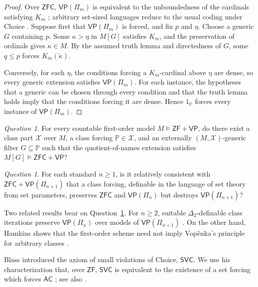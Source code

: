 \documentclass[11pt,a4paper]{amsart}
\newcommand{\VP}{\mathsf{VP}}
\newcommand{\AC}{\mathsf{AC}}
\newcommand{\ZF}{\mathsf{ZF}}
\newcommand{\ZFC}{\mathsf{ZFC}}
\theoremstyle{plain}
\theoremstyle{definition}
\theoremstyle{remark}
\newtheorem{question}[theorem]{Question}
\begin{document}
\begin{proof}
Over $\ZFC$, $\VP(\Pi_m)$ is equivalent to the unboundedness of the cardinals satisfying $K_m$ \cite[Theorem~4.3(2), Corollary~4.7, Theorem~4.11, and the paragraph following Theorem~4.12]{BagariaCn}; arbitrary set-sized languages reduce to the usual coding under Choice \cite[Lemma~23]{BrookeTaylor}.  Suppose first that $\VP(\Pi_m)$ is forced, and fix $p$ and $\eta$.  Choose a generic $G$ containing $p$.  Some $\kappa>\eta$ in $M[G]$ satisfies $K_m$, and the preservation of ordinals gives $\kappa\in M$.  By the assumed truth lemma and directedness of $G$, some $q\leq p$ forces $K_m(\check\kappa)$.

Conversely, for each $\eta$, the conditions forcing a $K_m$-cardinal above $\eta$ are dense, so every generic extension satisfies $\VP(\Pi_m)$.  For each instance, the hypotheses that a generic can be chosen through every condition and that the truth lemma holds imply that the conditions forcing it are dense.  Hence $1_{\mathbb P}$ forces every instance of $\VP(\Pi_m)$.
\end{proof}
\endgroup

\begin{question}\label{q:strong-restoration}
{For every countable first-order model $M\models\ZF+\VP$, do there exist a class part $\mathcal X$ over $M$, a class forcing $\mathbb P\in\mathcal X$, and an externally $(M,\mathcal X)$-generic filter $G\subseteq\mathbb P$ such that the quotient-of-names extension satisfies $M[G]\models\ZFC+\VP$?}
\end{question}

\begin{question}\label{q:selective-destruction}
{For each standard $n\geq1$, is it relatively consistent with $\ZFC+\VP(\Pi_{n+1})$ that a class forcing, definable in the language of set theory from set parameters, preserves $\ZFC$ and $\VP(\Pi_n)$ but destroys $\VP(\Pi_{n+1})$?}
\end{question}

Two related results bear on Question~\ref{q:selective-destruction}.  {For $n\geq2$, suitable $\Delta_2$-definable class iterations preserve $\VP(\Pi_n)$ over models of $\VP(\Pi_{n+1})$ \cite[Theorem~9.6]{BagariaPoveda}.}  {On the other hand, Hamkins shows that the first-order scheme need not imply Vop\v{e}nka's principle for arbitrary classes \cite[Theorem~11]{Hamkins}.}

Blass introduced the axiom of small violations of Choice, $\mathsf{SVC}$.  We use his characterization that, over $\ZF$, $\mathsf{SVC}$ is equivalent to the existence of a set forcing which forces $\AC$ \cite{Blass}; see also \cite[Section~3]{KaragilaDC}.
\end{document}
